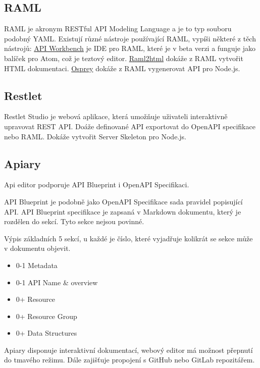 \documentclass[thesis=B,czech]{FITthesis}[2012/06/26]
\begin{document}
        \subsection{RAML}
            RAML je akronym RESTful API Modeling Language a je to typ souboru podobný YAML. Existují různé nástroje používající RAML, vypíši některé z těch nástrojů:
            \href{http://apiworkbench.com}{API Workbench} je IDE pro RAML, které je v beta verzi a funguje jako balíček pro Atom, což je teztový editor.
            \href{https://github.com/raml2html/raml2html}{Raml2html} dokáže z RAML vytvořit  HTML dokumentaci.
            \href{https://github.com/mulesoft/osprey}{Osprey} dokáže z RAML vygenerovat API pro Node.js.
        \subsection{Restlet}
            Restlet Studio je webová aplikace, která umožňuje uživateli interaktivně upravovat REST API. Doáže definované API exportovat do OpenAPI specifikace nebo RAML. Dokáže vytvořit  Server Skeleton pro Node.js.
        \subsection{Apiary}
            Api editor podporuje API Blueprint i OpenAPI Specifikaci.
            
            API Blueprint je podobně jako OpenAPI Specifikace sada pravidel popisující API. API Blueprint specifikace je zapsaná v Markdown dokumentu, který je rozdělen do sekcí. Tyto sekce nejsou povinné.
            
            Výpis základních 5 sekcí, u každé je číslo, které vyjadřuje kolikrát se sekce může v dokumentu objevit.
            \begin{itemize} %
                \item 0-1 Metadata
                \item 0-1 API Name \& overview
                \item 0+ Resource
                \item 0+ Resource Group
                \item 0+ Data Structures
            \end{itemize}
            
            Apiary disponuje interaktivní dokumentací, webový editor má možnost přepnutí do tmavého režimu. Dále zajišťuje propojení s GitHub nebo GitLab repozitářem.
\end{document}
